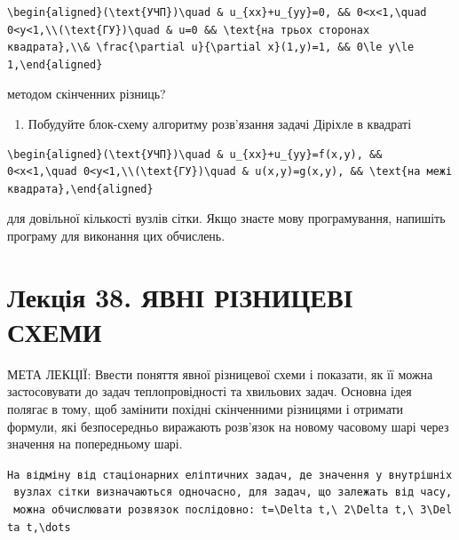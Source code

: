 \documentclass[
  ukrainian,
]{article}
\providecommand{\tightlist}{%
  \setlength{\itemsep}{0pt}\setlength{\parskip}{0pt}}
\begin{document}
\begin{verbatim}
\begin{aligned}(\text{УЧП})\quad & u_{xx}+u_{yy}=0, && 0<x<1,\quad 0<y<1,\\(\text{ГУ})\quad & u=0 && \text{на трьох сторонах квадрата},\\& \frac{\partial u}{\partial x}(1,y)=1, && 0\le y\le 1,\end{aligned}
\end{verbatim}

методом скінченних різниць?

\begin{enumerate}
\def\labelenumi{\arabic{enumi}.}
\setcounter{enumi}{5}
\tightlist
\item
  Побудуйте блок-схему алгоритму розв'язання задачі Діріхле в квадраті
\end{enumerate}

\begin{verbatim}
\begin{aligned}(\text{УЧП})\quad & u_{xx}+u_{yy}=f(x,y), && 0<x<1,\quad 0<y<1,\\(\text{ГУ})\quad & u(x,y)=g(x,y), && \text{на межі квадрата},\end{aligned}
\end{verbatim}

для довільної кількості вузлів сітки. Якщо знаєте мову програмування,
напишіть програму для виконання цих обчислень.

\section{Лекція 38. ЯВНІ РІЗНИЦЕВІ
СХЕМИ}\label{ux43bux435ux43aux446ux456ux44f-38.-ux44fux432ux43dux456-ux440ux456ux437ux43dux438ux446ux435ux432ux456-ux441ux445ux435ux43cux438}

МЕТА ЛЕКЦІЇ: Ввести поняття явної різницевої схеми і показати, як її
можна застосовувати до задач теплопровідності та хвильових задач.
Основна ідея полягає в тому, щоб замінити похідні скінченними різницями
і отримати формули, які безпосередньо виражають розв'язок на новому
часовому шарі через значення на попередньому шарі.

\texttt{На\ відміну\ від\ стаціонарних\ еліптичних\ задач,\ де\ значення\ у\ внутрішніх\ вузлах\ сітки\ визначаються\ одночасно,\ для\ задач,\ що\ залежать\ від\ часу,\ можна\ обчислювати\ розв\textquotesingle{}язок\ послідовно:\ \textquotesingle{}t=\textbackslash{}Delta\ t,\textbackslash{}\ 2\textbackslash{}Delta\ t,\textbackslash{}\ 3\textbackslash{}Delta\ t,\textbackslash{}dots\textquotesingle{}}
\end{document}
